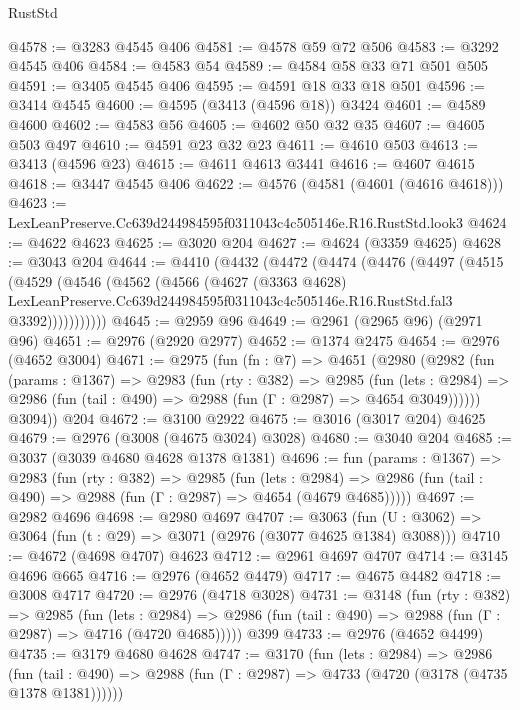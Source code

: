 \begin{lexlean}{RustStd}
\begin{coremodule}
@4578 := @3283 @4545 @406
@4581 := @4578 @59 @72 @506
@4583 := @3292 @4545 @406
@4584 := @4583 @54
@4589 := @4584 @58 @33 @71 @501 @505
@4591 := @3405 @4545 @406
@4595 := @4591 @18 @33 @18 @501
@4596 := @3414 @4545
@4600 := @4595 (@3413 (@4596 @18)) @3424
@4601 := @4589 @4600
@4602 := @4583 @56
@4605 := @4602 @50 @32 @35
@4607 := @4605 @503 @497
@4610 := @4591 @23 @32 @23
@4611 := @4610 @503
@4613 := @3413 (@4596 @23)
@4615 := @4611 @4613 @3441
@4616 := @4607 @4615
@4618 := @3447 @4545 @406
@4622 := @4576 (@4581 (@4601 (@4616 @4618)))
@4623 := LexLeanPreserve.Cc639d244984595f0311043c4c505146e.R16.RustStd.look3
@4624 := @4622 @4623
@4625 := @3020 @204
@4627 := @4624 (@3359 @4625)
@4628 := @3043 @204
@4644 := @4410
    (@4432
      (@4472
        (@4474
          (@4476
            (@4497
              (@4515
                (@4529
                  (@4546
                    (@4562
                      (@4566
                        (@4627
                          (@3363 @4628)
                          LexLeanPreserve.Cc639d244984595f0311043c4c505146e.R16.RustStd.fal3
                          @3392)))))))))))
@4645 := @2959 @96
@4649 := @2961 (@2965 @96) (@2971 @96)
@4651 := @2976 (@2920 @2977)
@4652 := @1374 @2475
@4654 := @2976 (@4652 @3004)
@4671 := @2975
    (fun (fn : @7) =>
    @4651
      (@2980
        (@2982
          (fun (params : @1367) =>
          @2983
            (fun (rty : @382) =>
            @2985
              (fun (lets : @2984) =>
              @2986 (fun (tail : @490) => @2988 (fun (Γ : @2987) => @4654 @3049))))))
        @3094))
    @204
@4672 := @3100 @2922
@4675 := @3016 (@3017 @204) @4625
@4679 := @2976 (@3008 (@4675 @3024) @3028)
@4680 := @3040 @204
@4685 := @3037 (@3039 @4680 @4628 @1378 @1381)
@4696 := fun (params : @1367) =>
  @2983
    (fun (rty : @382) =>
    @2985
      (fun (lets : @2984) =>
      @2986 (fun (tail : @490) => @2988 (fun (Γ : @2987) => @4654 (@4679 @4685)))))
@4697 := @2982 @4696
@4698 := @2980 @4697
@4707 := @3063 (fun (U : @3062) => @3064 (fun (t : @29) => @3071 (@2976 (@3077 @4625 @1384) @3088)))
@4710 := @4672 (@4698 @4707) @4623
@4712 := @2961 @4697 @4707
@4714 := @3145 @4696 @665
@4716 := @2976 (@4652 @4479)
@4717 := @4675 @4482
@4718 := @3008 @4717
@4720 := @2976 (@4718 @3028)
@4731 := @3148
    (fun (rty : @382) =>
    @2985
      (fun (lets : @2984) =>
      @2986 (fun (tail : @490) => @2988 (fun (Γ : @2987) => @4716 (@4720 @4685)))))
    @399
@4733 := @2976 (@4652 @4499)
@4735 := @3179 @4680 @4628
@4747 := @3170
    (fun (lets : @2984) =>
    @2986
      (fun (tail : @490) => @2988 (fun (Γ : @2987) => @4733 (@4720 (@3178 (@4735 @1378 @1381))))))

\end{coremodule}
\end{lexlean}
